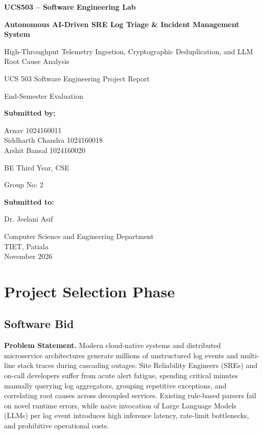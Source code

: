 \documentclass[12pt,a4paper,oneside]{report}
\begin{document}
\begin{titlepage}
  \centering
  \vspace*{0.5cm}
  {\large\bfseries UCS503 -- Software Engineering Lab\par}
  \vspace{1.8cm}
  {\Huge\bfseries Autonomous AI-Driven SRE Log Triage \& Incident Management System\par}
  \vspace{0.3cm}
  {\Large High-Throughput Telemetry Ingestion, Cryptographic Deduplication, and LLM Root Cause Analysis\par}
  \vspace{1.2cm}
  {\Large UCS 503 Software Engineering Project Report\par}
  \vspace{0.2cm}
  {\large End-Semester Evaluation\par}
  \vspace{1.2cm}
  {\large\bfseries Submitted by:\par}
  \vspace{0.25cm}
  Arnav \hspace{1.2cm} 1024160011\\
  Siddharth Chandra \hspace{1.2cm} 1024160018\\
  Arshit Bansal \hspace{1.2cm} 1024160020\\
  \vspace{0.55cm}
  {\large BE Third Year, CSE\par}
  \vspace{0.2cm}
  Group No: 2
  \vfill
  {\large\bfseries Submitted to:\par}
  Dr. Jeelani Asif
  \vfill
  {\large Computer Science and Engineering Department\\
  TIET, Patiala\\
  November 2026\par}
\end{titlepage}


\chapter{Project Selection Phase}

\section{Software Bid}
\textbf{Problem Statement.} Modern cloud-native systems and distributed microservice architectures generate millions of unstructured log events and multi-line stack traces during cascading outages. Site Reliability Engineers (SREs) and on-call developers suffer from acute alert fatigue, spending critical minutes manually querying log aggregators, grouping repetitive exceptions, and correlating root causes across decoupled services. Existing rule-based parsers fail on novel runtime errors, while naive invocation of Large Language Models (LLMs) per log event introduces high inference latency, rate-limit bottlenecks, and prohibitive operational costs.
\end{document}
